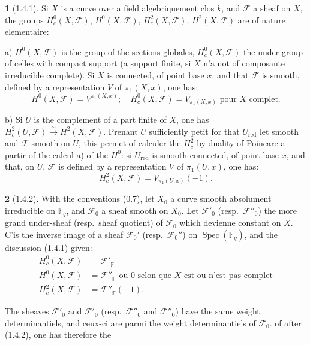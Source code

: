 \documentclass[12pt,a4paper]{article}
\theoremstyle{plain}
\theoremstyle{definition}
\theoremstyle{definition}
\newtheorem{para}{}[section]
\theoremstyle{remark}
\DeclareMathOperator{\Spec}{Spec}
\begin{document}
\begin{para}[1.4.1]
Si $X$ is a curve over a field algebriquement clos $k$, and $\mathscr{F}$ a sheaf on $X$, the groups $H_c^0(X, \mathscr{F})$, $H^0(X, \mathscr{F})$, $H_c^2(X, \mathscr{F})$, $H^2(X, \mathscr{F})$ are of nature elementaire:

a) $H^0(X, \mathscr{F})$ is the group of the sections globales, $H_c^0(X, \mathscr{F})$ the under-group of celles with compact support (a support finite, si $X$ n'a not of composante irreducible complete). Si $X$ is connected, of point base $x$, and that $\mathscr{F}$ is smooth, defined by a representation $V$ of $\pi_1(X, x)$, one has:
\begin{equation}\tag{1.4.1.1}
H^0(X, \mathscr{F}) = V^{\pi_1(X, x)}; \quad H_c^0(X, \mathscr{F}) = V_{\pi_1(X, x)} \text{ pour $X$ complet.}
\end{equation}

b) Si $U$ is the complement of a part finite of $X$, one has $H_c^2(U, \mathscr{F}) \xrightarrow{\sim} H^2(X, \mathscr{F})$. Prenant $U$ sufficiently petit for that $U_{\text{red}}$ let smooth and $\mathscr{F}$ smooth on $U$, this permet of calculer the $H_c^2$ by duality of Poincare a partir of the calcul a) of the $H^0$: si $U_{\text{red}}$ is smooth connected, of point base $x$, and that, on $U$, $\mathscr{F}$ is defined by a representation $V$ of $\pi_1(U, x)$, one has:
\begin{equation}\tag{1.4.1.2}
H_c^2(X, \mathscr{F}) = V_{\pi_1(U, x)}(-1).
\end{equation}
\end{para}

\begin{para}[1.4.2]
With the conventions (0.7), let $X_0$ a curve smooth absolument irreducible on $\mathbb{F}_q$, and $\mathscr{F}_0$ a sheaf smooth on $X_0$. Let $\mathscr{F}'_0$ (resp.~$\mathscr{F}''_0$) the more grand under-sheaf (resp.~sheaf quotient) of $\mathscr{F}_0$ which devienne constant on $X$. C'is the inverse image of a sheaf $\mathscr{F}_0'$ (resp.~$\mathscr{F}_0''$) on $\Spec(\mathbb{F}_q)$, and the discussion (1.4.1) given:
\begin{align}
H_c^0(X, \mathscr{F}) &= \mathscr{F}'_{\overline{\mathbb{F}}} \tag{1.4.2.1}\\
H^0(X, \mathscr{F}) &= \mathscr{F}''_{\overline{\mathbb{F}}} \text{ ou } 0 \text{ selon que $X$ est ou n'est pas complet} \tag{1.4.2.2}\\
H_c^2(X, \mathscr{F}) &= \mathscr{F}''_{\overline{\mathbb{F}}}(-1). \tag{1.4.2.3}
\end{align}

The sheaves $\mathscr{F}'_0$ and $\mathscr{F}'_0$ (resp.~$\mathscr{F}''_0$ and $\mathscr{F}''_0$) have the same weight determinantiels, and ceux-ci are parmi the weight determinantiels of $\mathscr{F}_0$. of after (1.4.2), one has therefore the
\end{para}
\end{document}
